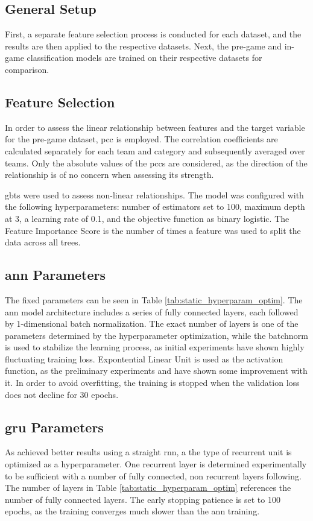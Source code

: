 \documentclass[12pt, a4paper, headinclude, twoside, plainheadsepline, open=right, numbers=noenddot, hidelinks, toc=listof, toc=bibliography]{scrreprt}
\begin{document}
\subsection{General Setup}
\label{ssec:general_setup}
First, a separate feature selection process is conducted for each dataset, and the results are then applied to the respective datasets. 
Next, the pre-game and in-game classification models are trained on their respective datasets for comparison.

\subsection{Feature Selection}

In order to assess the linear relationship between features and the target variable for the pre-game dataset, \acl{pcc} is employed.
The correlation coefficients are calculated separately for each team and category and subsequently averaged over teams.
Only the absolute values of the \acp{pcc} are considered, as the direction of the relationship is of no concern when assessing its strength.

\Aclp{gbt} were used to assess non-linear relationships.
The model was configured with the following hyperparameters: number of estimators set to 100, maximum depth at 3, a learning rate of 0.1, and the objective function as binary logistic.
The Feature Importance Score is the number of times a feature was used to split the data across all trees.

\subsection{\Ac{ann} Parameters}
The fixed parameters can be seen in Table \ref{tab:static_hyperparam_optim}.
The \ac{ann} model architecture includes a series of fully connected layers, each followed by 1-dimensional batch normalization.
The exact number of layers is one of the parameters determined by the hyperparameter optimization, while the batchnorm is used to stabilize the learning process, as initial experiments have shown highly fluctuating training loss.
Expontential Linear Unit is used as the activation function, as the preliminary experiments and \citeauthor{doUsingMachineLearning2021} \cite{doUsingMachineLearning2021} have shown some improvement with it.
In order to avoid overfitting, the training is stopped when the validation loss does not decline for 30 epochs.

\subsection{\Ac{gru} Parameters}
As \citeauthor{silvaContinuousOutcomePrediction2018} \cite{silvaContinuousOutcomePrediction2018} achieved better results using a straight \ac{rnn}, a the type of recurrent unit is optimized as a hyperparameter.
One recurrent layer is determined experimentally to be sufficient with a number of fully connected, non recurrent layers following.
The number of layers in Table \ref{tab:static_hyperparam_optim} references the number of fully connected layers.
The early stopping patience is set to 100 epochs, as the training converges much slower than the \ac{ann} training.
\end{document}
